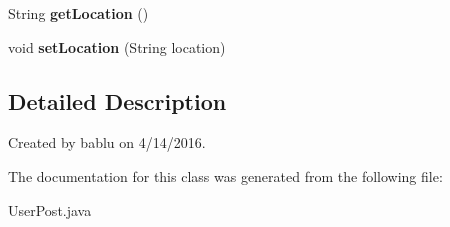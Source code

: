 \begin{DoxyCompactItemize}
\item 
\hypertarget{classcom_1_1example_1_1sel_1_1lostfound_1_1UserPost_a270d7e2d632aeaaf74c0157f8cd59dce}{String {\bfseries get\-Location} ()}\label{classcom_1_1example_1_1sel_1_1lostfound_1_1UserPost_a270d7e2d632aeaaf74c0157f8cd59dce}

\item 
\hypertarget{classcom_1_1example_1_1sel_1_1lostfound_1_1UserPost_ad5125a5c2edf33651ace995ae065ecdf}{void {\bfseries set\-Location} (String location)}\label{classcom_1_1example_1_1sel_1_1lostfound_1_1UserPost_ad5125a5c2edf33651ace995ae065ecdf}

\end{DoxyCompactItemize}


\subsection{Detailed Description}
Created by bablu on 4/14/2016. 

The documentation for this class was generated from the following file\-:\begin{DoxyCompactItemize}
\item 
User\-Post.\-java\end{DoxyCompactItemize}
